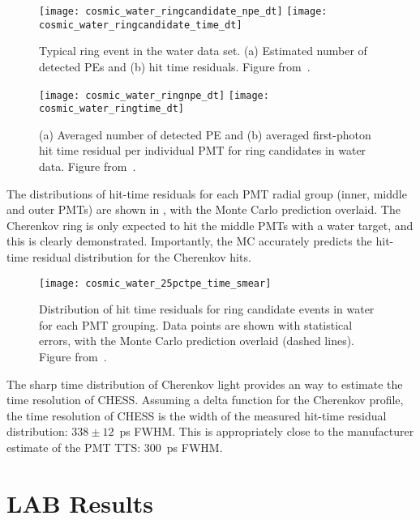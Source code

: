 \begin{figure}
	\centering
	\texttt{[image: cosmic\_water\_ringcandidate\_npe\_dt]}
	\texttt{[image: cosmic\_water\_ringcandidate\_time\_dt]}
	\caption{Typical ring event in the water data set. (a) Estimated number of detected PEs and (b) hit time residuals. Figure from~\cite{chess_nim}.}
	\label{fig:cosmics_water_ring_candidate}
\end{figure}


\begin{figure}
	\centering
	\texttt{[image: cosmic\_water\_ringnpe\_dt]}
	\texttt{[image: cosmic\_water\_ringtime\_dt]}
	\caption{(a) Averaged number of detected PE and (b) averaged first-photon hit time residual per individual PMT for ring candidates in water data. Figure from~\cite{chess_nim}.}
	\label{fig:cosmics_water_npes}
\end{figure}


The distributions of hit-time residuals for each PMT radial group (inner, middle and outer PMTs) are shown in , with the Monte Carlo prediction overlaid. 
The Cherenkov ring is only expected to hit the middle PMTs with a water target, and this is clearly demonstrated.
Importantly, the MC accurately predicts the hit-time residual distribution for the Cherenkov hits. 


\begin{figure}
	\centering
	\texttt{[image: cosmic\_water\_25pctpe\_time\_smear]}
	\caption{Distribution of hit time residuals for ring candidate events in water for each PMT grouping. Data points are shown with statistical errors, with the Monte Carlo prediction overlaid (dashed lines). Figure from~\cite{chess_nim}.}
	\label{fig:cosmics_water}
\end{figure}


The sharp time distribution of Cherenkov light provides an way to estimate the time resolution of CHESS.
Assuming a delta function for the Cherenkov profile, the time resolution of CHESS is the width of the measured hit-time residual distribution: $338\pm 12$~ps FWHM. 
This is appropriately close to the manufacturer estimate of the PMT TTS: 300~ps FWHM. 

\clearpage

\section{LAB Results}

\label{sec:lab}

